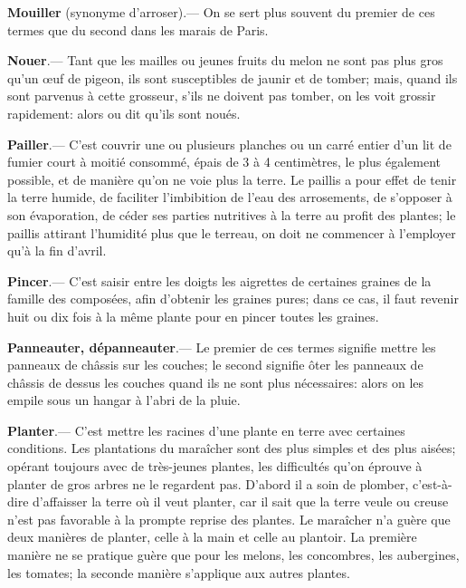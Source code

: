 \documentclass[10pt,a4paper]{book}
\begin{document}
\textbf{Mouiller} (synonyme d'arroser).--- On se sert plus souvent du premier de ces termes que du second dans les marais de Paris.

\textbf{Nouer}.--- Tant que les mailles ou jeunes fruits du melon ne sont pas plus gros qu'un œuf de pigeon, ils sont susceptibles de jaunir et de tomber; mais, quand ils sont parvenus à cette grosseur, s'ils ne doivent pas tomber, on les voit grossir rapidement: alors ou dit qu'ils sont noués.

\textbf{Pailler}.--- C'est couvrir une ou plusieurs planches ou un carré entier d'un lit de fumier court à moitié consommé, épais de 3 à 4 centimètres, le plus également possible, et de manière qu'on ne voie plus la terre. Le paillis a pour effet de tenir la terre humide, de faciliter l'imbibition de l'eau des arrosements, de s'opposer à son évaporation, de céder ses parties nutritives à la terre au profit des plantes; le paillis attirant l'humidité plus que le terreau, on doit ne commencer à l'employer qu'à la fin d'avril.

\textbf{Pincer}.--- C'est saisir entre les doigts les aigrettes de certaines graines de la famille des composées, afin d'obtenir les graines pures; dans ce cas, il faut revenir huit ou dix fois à la même plante pour en pincer toutes les graines.

\textbf{Panneauter, dépanneauter}.--- Le premier de ces termes signifie mettre les panneaux de châssis sur les couches; le second signifie ôter les panneaux de châssis de dessus les couches quand ils ne sont plus nécessaires: alors on les empile sous un hangar à l'abri de la pluie.

\textbf{Planter}.--- C'est mettre les racines d'une plante en terre avec certaines conditions. Les plantations du maraîcher sont des plus simples et des plus aisées; opérant toujours avec de très-jeunes plantes, les difficultés qu'on éprouve à planter de gros arbres ne le regardent pas. D'abord il a soin de plomber, c'est-à-dire d'affaisser la terre où il veut planter, car il sait que la terre veule ou creuse n'est pas favorable à la prompte reprise des plantes. Le maraîcher n'a guère que deux manières de planter, celle à la main et celle au plantoir. La première manière ne se pratique guère que pour les melons, les concombres, les aubergines, les tomates; la seconde manière s'applique aux autres plantes.
\end{document}
